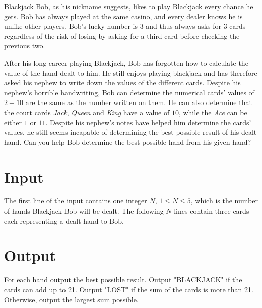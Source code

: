 Blackjack Bob, as his nickname suggests, likes to play Blackjack every chance he gets.
Bob has always played at the same casino, and every dealer knows he is unlike other players.
Bob's lucky number is $3$ and thus always asks for $3$ cards regardless of the risk of losing by asking for a third card before checking the previous two.

After his long career playing Blackjack, Bob has forgotten how to calculate the value of the hand dealt to him.
He still enjoys playing blackjack and has therefore asked his nephew to write down the values of the different cards.
Despite his nephew's horrible handwriting, Bob can determine the numerical cards' values of $2-10$ are the same as the number written on them.
He can also determine that the court cards \textit{Jack}, \textit{Queen} and \textit{King} have a value of $10$, while the \textit{Ace} can be either $1$ or $11$.
Despite his nephew's notes have helped him determine the cards' values, he still seems incapable of determining the best possible result of his dealt hand.
Can you help Bob determine the best possible hand from his given hand?
\section*{Input}

The first line of the input contains one integer $N$, $1 \leq N \leq 5$, which is the number of hands Blackjack Bob will be dealt.
The following $N$ lines contain three cards each representing a dealt hand to Bob.


\section*{Output}

For each hand output the best possible result.
Output "BLACKJACK" if the cards can add up to 21.
Output "LOST" if the sum of the cards is more than 21.
Otherwise, output the largest sum possible.

